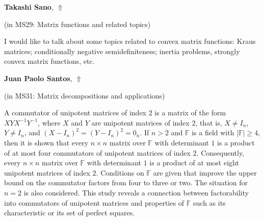 \documentclass[ILAS2025-program.tex]{subfiles}
\begin{document}
\hypertarget{down0125}{}\begin{ilasabstract}
    
\textbf{Takashi Sano},  \hfill \hyperlink{up0125}{$\Uparrow$}
    
    
(in {\color{mstitle}MS29: Matrix functions and related topics})
        
\mtskip
    I would like to talk about some topics related to convex matrix functions: 
Kraus matrices; conditionally negative semidefiniteness; inertia problems, strongly convex matrix functions, etc. 

\end{ilasabstract}
    

\hypertarget{down0307}{}\begin{ilasabstract}
    
\textbf{Juan Paolo Santos},  \hfill \hyperlink{up0307}{$\Uparrow$}
    
    
(in {\color{mstitle}MS31: Matrix decompositions and applications})
        
\mtskip
    A commutator of unipotent matrices of index $2$ is a matrix of the form $XYX^{-1}Y^{-1}$, where $X$ and $Y$ are unipotent matrices of index $2$, that is, $X \ne I_n$, $Y \ne I_n$, and $(X-I_n)^2=(Y-I_n)^2=0_n$. If $n>2$ and $\mathbb{F}$ is a field with $|\mathbb{F}| \geq 4$, then it is shown that every $n \times n$ matrix over $\mathbb{F}$ with determinant $1$ is a product of at most four commutators of unipotent matrices of index $2$. Consequently, every $n \times n$ matrix over $\mathbb{F}$ with determinant $1$ is a product of at most eight unipotent matrices of index $2$. Conditions on $\mathbb{F}$ are given that improve the upper bound on the commutator factors from four to three or two. The situation for $n=2$ is also considered. This study reveals a connection between factorability into commutators of unipotent matrices and properties of $\mathbb{F}$ such as its characteristic or its set of perfect squares.
\end{ilasabstract}
    
\end{document}

